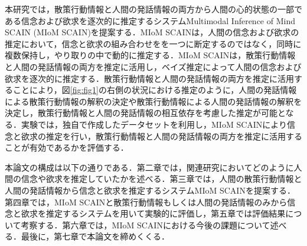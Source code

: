 
\par
本研究では，散策行動情報と人間の発話情報の両方から人間の心的状態の一部である信念および欲求を逐次的に推定するシステムMultimodal Inference of Mind SCAIN (MIoM SCAIN)を提案する．MIoM SCAINは，人間の信念および欲求の推定において，信念と欲求の組み合わせをを一つに断定するのではなく，同時に複数保持し，やり取りの中で動的に推定する．MIoM SCAINは，散策行動情報と人間の発話情報の両方を推定に活用し，ベイズ推定によって人間の信念および欲求を逐次的に推定する．散策行動情報と人間の発話情報の両方を推定に活用することにより，図\ref{fig:fig1}の右側の状況における推定のように，人間の発話情報による散策行動情報の解釈の決定や散策行動情報による人間の発話情報の解釈を決定し，散策行動情報と人間の発話情報の相互依存を考慮した推定が可能となる．実験では，独自で作成したデータセットを利用し，MIoM SCAINにより信念と欲求の推定を行い，散策行動情報と人間の発話情報の両方を推定に活用することが有効であるかを評価する．

\par
本論文の構成は以下の通りである．第二章では，関連研究においてどのように人間の信念や欲求を推定していたかを述べる．第三章では，人間の散策行動情報と人間の発話情報から信念と欲求を推定するシステムMIoM SCAINを提案する．第四章では，MIoM SCAINと散策行動情報もしくは人間の発話情報のみから信念と欲求を推定するシステムを用いて実験的に評価し，第五章では評価結果について考察する．第六章では，MIoM SCAINにおける今後の課題について述べる．最後に，第七章で本論文を締めくくる．
